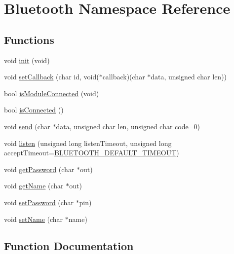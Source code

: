 \hypertarget{namespace_bluetooth}{}\section{Bluetooth Namespace Reference}
\label{namespace_bluetooth}
\subsection*{Functions}
\begin{DoxyCompactItemize}
\item 
void \mbox{\hyperlink{namespace_bluetooth_af5eca873435207a9ebc7d940f94b4464}{init}} (void)
\item 
void \mbox{\hyperlink{namespace_bluetooth_ac0b875e86220d5ad1a194fd9503494ff}{set\+Callback}} (char id, void($\ast$callback)(char $\ast$data, unsigned char len))
\item 
bool \mbox{\hyperlink{namespace_bluetooth_a3fe8dfbf207574a954a161112d2d5210}{is\+Module\+Connected}} (void)
\item 
bool \mbox{\hyperlink{namespace_bluetooth_a339db81b59168385379a2d0872d1c1b8}{is\+Connected}} ()
\item 
void \mbox{\hyperlink{namespace_bluetooth_a9ad33cca29bf063358e0f7dfbefdd38e}{send}} (char $\ast$data, unsigned char len, unsigned char code=0)
\item 
void \mbox{\hyperlink{namespace_bluetooth_a4720c670f39b68ad09ab0426a586684e}{listen}} (unsigned long listen\+Timeout, unsigned long accept\+Timeout=\mbox{\hyperlink{config_8h_a1abf7783a21bd29cabcbde11b37d9739}{B\+L\+U\+E\+T\+O\+O\+T\+H\+\_\+\+D\+E\+F\+A\+U\+L\+T\+\_\+\+T\+I\+M\+E\+O\+UT}})
\item 
void \mbox{\hyperlink{namespace_bluetooth_aa4106d9b9a752c4dbf6ae8e098a4a5b6}{get\+Password}} (char $\ast$out)
\item 
void \mbox{\hyperlink{namespace_bluetooth_a3a7424882a0f6f3ea6e6cb3ae363ee58}{get\+Name}} (char $\ast$out)
\item 
void \mbox{\hyperlink{namespace_bluetooth_a180dbaf21f449e085983a7d2443d24f6}{set\+Password}} (char $\ast$pin)
\item 
void \mbox{\hyperlink{namespace_bluetooth_a75f8c76cf9fea1f13426ada5be430673}{set\+Name}} (char $\ast$name)
\end{DoxyCompactItemize}


\subsection{Function Documentation}
\mbox{\label{namespace_bluetooth_a3a7424882a0f6f3ea6e6cb3ae363ee58}} 
